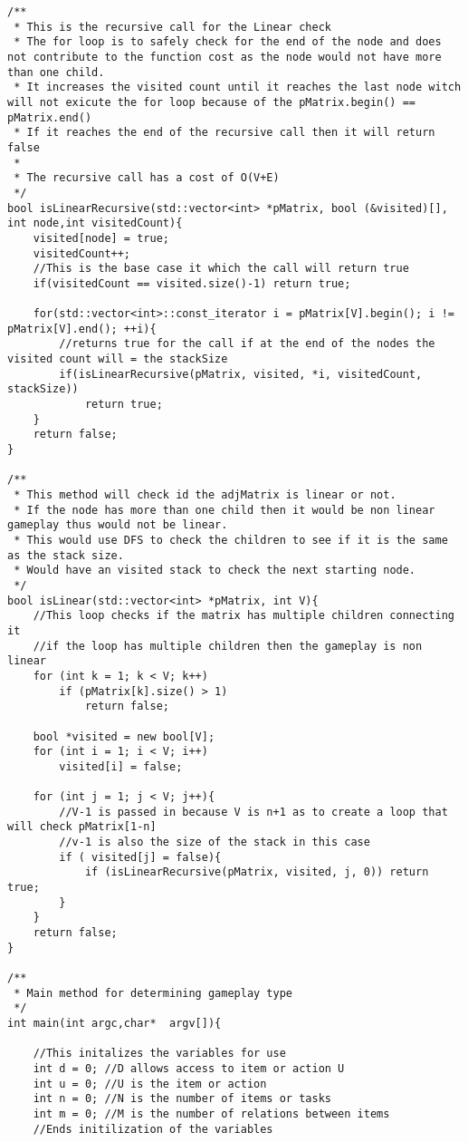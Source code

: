\documentclass[11pt]{article}
\begin{document}
\begin{lstlisting}[frame=single]
/**
 * This is the recursive call for the Linear check
 * The for loop is to safely check for the end of the node and does not contribute to the function cost as the node would not have more than one child.
 * It increases the visited count until it reaches the last node witch will not exicute the for loop because of the pMatrix.begin() == pMatrix.end()
 * If it reaches the end of the recursive call then it will return false
 *
 * The recursive call has a cost of O(V+E)
 */
bool isLinearRecursive(std::vector<int> *pMatrix, bool (&visited)[], int node,int visitedCount){
    visited[node] = true;
    visitedCount++;
    //This is the base case it which the call will return true
    if(visitedCount == visited.size()-1) return true;
     
    for(std::vector<int>::const_iterator i = pMatrix[V].begin(); i != pMatrix[V].end(); ++i){
        //returns true for the call if at the end of the nodes the visited count will = the stackSize
        if(isLinearRecursive(pMatrix, visited, *i, visitedCount, stackSize))
            return true;   
    }
    return false;             
}

/**
 * This method will check id the adjMatrix is linear or not.
 * If the node has more than one child then it would be non linear gameplay thus would not be linear.
 * This would use DFS to check the children to see if it is the same as the stack size.
 * Would have an visited stack to check the next starting node.
 */
bool isLinear(std::vector<int> *pMatrix, int V){
    //This loop checks if the matrix has multiple children connecting it 
    //if the loop has multiple children then the gameplay is non linear    
    for (int k = 1; k < V; k++)
        if (pMatrix[k].size() > 1) 
            return false;
    
    bool *visited = new bool[V];
    for (int i = 1; i < V; i++) 
        visited[i] = false;

    for (int j = 1; j < V; j++){
        //V-1 is passed in because V is n+1 as to create a loop that will check pMatrix[1-n] 
        //v-1 is also the size of the stack in this case
        if ( visited[j] = false){            
            if (isLinearRecursive(pMatrix, visited, j, 0)) return true;
        }
    }
    return false;      
}

/**
 * Main method for determining gameplay type
 */
int main(int argc,char*  argv[]){

    //This initalizes the variables for use
    int d = 0; //D allows access to item or action U
    int u = 0; //U is the item or action 
    int n = 0; //N is the number of items or tasks
    int m = 0; //M is the number of relations between items
    //Ends initilization of the variables
    

\end{lstlisting}
\end{document}
